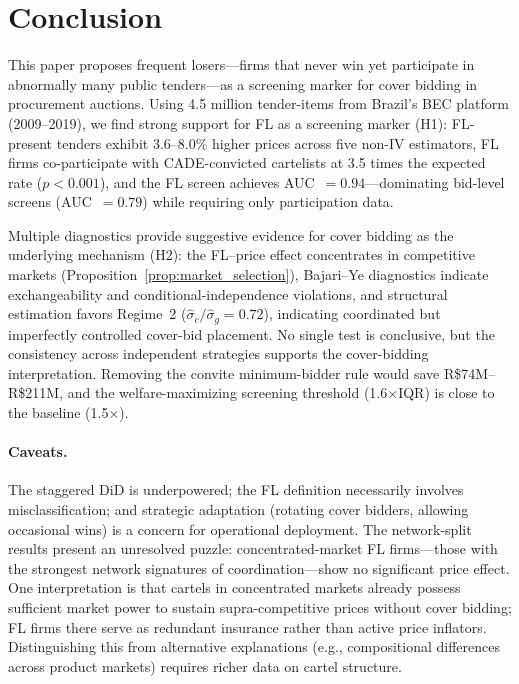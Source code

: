 \section{Conclusion}
\label{sec:conclusion}

This paper proposes frequent losers---firms that never win yet
participate in abnormally many public tenders---as a screening marker
for cover bidding in procurement auctions. Using 4.5 million
tender-items from Brazil's BEC platform (2009--2019), we find strong
support for FL as a screening marker (H1): FL-present tenders exhibit
3.6--8.0\% higher prices across five non-IV estimators, FL firms
co-participate with CADE-convicted
cartelists at 3.5 times the expected rate ($p < 0.001$), and the FL
screen achieves AUC~$= 0.94$---dominating bid-level screens
(AUC~$= 0.79$) while requiring only participation data.

Multiple diagnostics provide suggestive evidence for cover bidding as
the underlying mechanism (H2): the FL--price effect concentrates in
competitive markets (Proposition~\ref{prop:market_selection}),
Bajari--Ye diagnostics indicate exchangeability and
conditional-independence violations, and structural estimation favors
Regime~2 ($\hat{\sigma}_c / \hat{\sigma}_g = 0.72$), indicating
coordinated but imperfectly controlled cover-bid placement. No single
test is conclusive, but the consistency across independent strategies
supports the cover-bidding interpretation. Removing the convite
minimum-bidder rule would save R\$74M--R\$211M, and the
welfare-maximizing screening threshold (1.6$\times$IQR) is close to the
baseline (1.5$\times$).

\paragraph{Caveats.}
The staggered DiD is underpowered; the FL definition necessarily
involves misclassification; and strategic adaptation (rotating cover
bidders, allowing occasional wins) is a concern for operational
deployment. The network-split results present an unresolved puzzle:
concentrated-market FL firms---those with the strongest network
signatures of coordination---show no significant price effect. One
interpretation is that cartels in concentrated markets already possess
sufficient market power to sustain supra-competitive prices without
cover bidding; FL firms there serve as redundant insurance rather than
active price inflators. Distinguishing this from alternative
explanations (e.g., compositional differences across product markets)
requires richer data on cartel structure.

